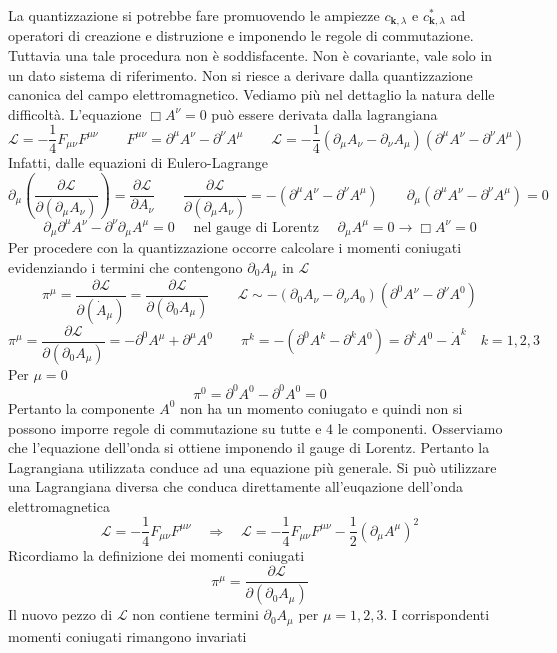 La quantizzazione si potrebbe fare promuovendo le ampiezze $c_{\mathbf{k},\lambda}$ e $c^*_{\mathbf{k},\lambda}$ ad operatori di creazione e distruzione e imponendo le regole di commutazione. Tuttavia una tale procedura non è soddisfacente. Non è covariante, vale solo in un dato sistema di riferimento. Non si riesce a derivare dalla quantizzazione canonica del campo elettromagnetico. Vediamo più nel dettaglio la natura delle difficoltà. L'equazione $\Box A^\nu=0$ può essere derivata dalla lagrangiana
$$
\mathcal{L} = -\frac{1}{4} F_{\mu\nu} F^{\mu\nu} \qquad F^{\mu\nu} = \partial^\mu A^\nu - \partial^\nu A^\mu \qquad \mathcal{L} = -\frac{1}{4}(\partial_\mu A_\nu - \partial_\nu A_\mu)(\partial^\mu A^\nu - \partial^\nu A^\mu)
$$
Infatti, dalle equazioni di Eulero-Lagrange
$$
\partial_\mu \left( \frac{\partial\mathcal{L}}{\partial(\partial_\mu A_\nu)} \right) = \frac{\partial\mathcal{L}}{\partial A_\nu} \qquad \frac{\partial\mathcal{L}}{\partial(\partial_\mu A_\nu)} = -(\partial^\mu A^\nu - \partial^\nu A^\mu) \qquad \partial_\mu (\partial^\mu A^\nu - \partial^\nu A^\mu) = 0
$$
$$
\partial_\mu\partial^\mu A^\nu - \partial^\nu\partial_\mu A^\mu = 0 \quad \text{ nel gauge di Lorentz }\quad\partial_\mu A^\mu = 0 \to \Box A^\nu = 0
$$
Per procedere con la quantizzazione occorre calcolare i momenti coniugati evidenziando i termini che contengono $\partial_0 A_\mu$ in $\mathcal{L}$
$$
\pi^\mu = \frac{\partial\mathcal{L}}{\partial(\dot{A}_\mu)} = \frac{\partial\mathcal{L}}{\partial(\partial_0 A_\mu)} \qquad \mathcal{L} \sim -(\partial_0 A_\nu - \partial_\nu A_0)(\partial^0 A^\nu - \partial^\nu A^0)
$$
$$
\pi^\mu = \frac{\partial\mathcal{L}}{\partial(\partial_0 A_\mu)} = -\partial^0 A^\mu + \partial^\mu A^0 \qquad \pi^k = -(\partial^0 A^k - \partial^k A^0) = \partial^k A^0 - \dot{A}^k \quad k=1,2,3
$$
Per $\mu=0$
$$
\pi^0 = \partial^0 A^0 - \partial^0 A^0 = 0
$$
Pertanto la componente $A^0$ non ha un momento coniugato e quindi non si possono imporre regole di commutazione su tutte e $4$ le componenti. Osserviamo che l'equazione dell'onda si ottiene imponendo il gauge di Lorentz. Pertanto la Lagrangiana utilizzata conduce ad una equazione più generale. Si può utilizzare una Lagrangiana diversa che conduca direttamente all'euqazione dell'onda elettromagnetica
$$
\mathcal{L} = -\frac{1}{4} F_{\mu\nu} F^{\mu\nu} \quad \Longrightarrow \quad \mathcal{L} = -\frac{1}{4} F_{\mu\nu} F^{\mu\nu} - \frac{1}{2}(\partial_\mu A^\mu)^2
$$
Ricordiamo la definizione dei momenti coniugati
$$
\pi^\mu = \frac{\partial\mathcal{L}}{\partial(\partial_0 A_\mu)}
$$
Il nuovo pezzo di $\mathcal{L}$ non contiene termini $\partial_0A_\mu$ per $\mu=1,2,3$. I corrispondenti momenti coniugati rimangono invariati
